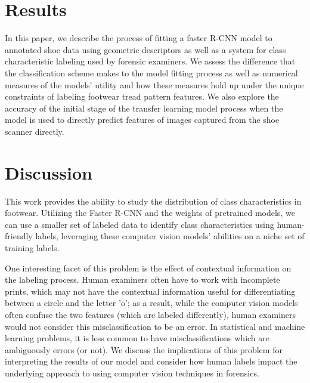 \documentclass[10pt]{article}
\newcommand{\svp}[1]{{\textcolor{RedOrange}{#1}}}
\begin{document}
\section{Results}
\svp{
In this paper, we describe the process of fitting a faster R-CNN model to annotated shoe data using geometric descriptors as well as a system for class characteristic labeling used by forensic examiners.
We assess the difference that the classification scheme makes to the model fitting process as well as numerical measures of the models' utility and how these measures hold up under the unique constraints of labeling footwear tread pattern features.
We also explore the accuracy of the initial stage of the transfer learning model process when the model is used to directly predict features of images captured from the shoe scanner directly.
}


\section{Discussion }
This work provides the ability to study the distribution of class characteristics in footwear.
Utilizing the Faster R-CNN and the weights of pretrained models,
\svp{we can use a smaller set of labeled data to identify class characteristics using human-friendly labels, leveraging these computer vision models' abilities on a niche set of training labels.}

\svp{One interesting facet of this problem is the effect of contextual information on the labeling process.
Human examiners often have to work with incomplete prints, which may not have the contextual information useful for differentiating between a circle and the letter 'o'; as a result, while the computer vision models often confuse the two features (which are labeled differently), human examiners would not consider this misclassification to be an error.
In statistical and machine learning problems, it is less common to have misclassifications which are ambiguously errors (or not).
We discuss the implications of this problem for interpreting the results of our model and consider how human labels impact the underlying approach to using computer vision techniques in forensics.
}



\end{document}
